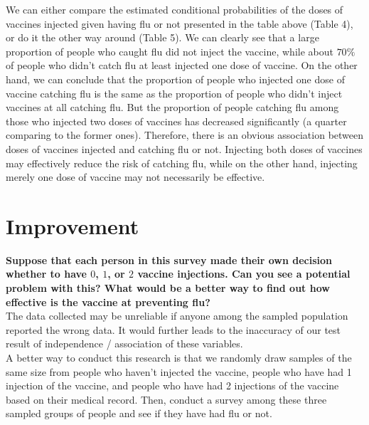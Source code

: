 \documentclass[
]{book}
\begin{document}
We can either compare the estimated conditional probabilities of the doses of vaccines injected given having flu or not presented in the table above (Table 4), or do it the other way around (Table 5). We can clearly see that a large proportion of people who caught flu did not inject the vaccine, while about \(70\%\) of people who didn't catch flu at least injected one dose of vaccine. On the other hand, we can conclude that the proportion of people who injected one dose of vaccine catching flu is the same as the proportion of people who didn't inject vaccines at all catching flu. But the proportion of people catching flu among those who injected two doses of vaccines has decreased significantly (a quarter comparing to the former ones). Therefore, there is an obvious association between doses of vaccines injected and catching flu or not. Injecting both doses of vaccines may effectively reduce the risk of catching flu, while on the other hand, injecting merely one dose of vaccine may not necessarily be effective.

\section{Improvement}\label{improvement}

\textbf{Suppose that each person in this survey made their own decision whether to have \(0\), \(1\), or \(2\) vaccine injections. Can you see a potential problem with this? What would be a better way to find out how effective is the vaccine at preventing flu?}\\
The data collected may be unreliable if anyone among the sampled population reported the wrong data. It would further leads to the inaccuracy of our test result of independence / association of these variables.\\
A better way to conduct this research is that we randomly draw samples of the same size from people who haven't injected the vaccine, people who have had 1 injection of the vaccine, and people who have had 2 injections of the vaccine based on their medical record. Then, conduct a survey among these three sampled groups of people and see if they have had flu or not.

  
\end{document}
